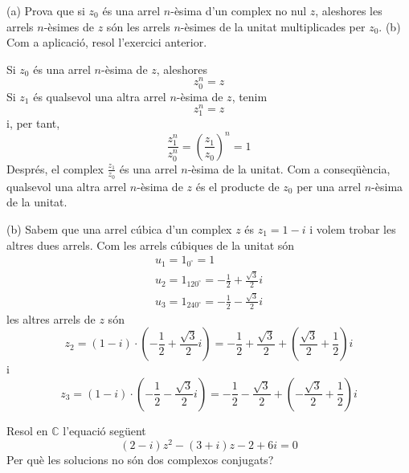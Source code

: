 \begin{exercici}
(a) Prova que si $z_{0}$ és una arrel $n$-èsima d’un complex no
nul $z$, aleshores les arrels $n$-èsimes de $z$ són les arrels
$n$-èsimes de la unitat multiplicades per $z_{0}$. (b) Com a aplicació, resol l’exercici anterior.
\end{exercici}

\begin{solucio}
Si $z_{0}$ és una arrel $n$-èsima de $z$, aleshores
\[
z_{0}^{n}=z
\]
Si $z_{1}$ és qualsevol una altra arrel $n$-èsima de $z$, tenim
\[
z_{1}^{n}=z
\]
i, per tant,
\[
\frac{z_{1}^{n}}{z_{0}^{n}}=\left( \frac{z_{1}}{z_{0}}\right) ^{n}=1
\]
Després, el complex $\frac{z_{1}}{z_{0}}$ és una arrel $n$-èsima de
la unitat. Com a conseqüència, qualsevol una altra arrel $n$-èsima de $z$
és el producte de $z_{0}$ per una arrel $n$-èsima de la unitat.

(b) Sabem que una arrel cúbica d’un complex $z$ és $z_{1}=1-i$ i
volem trobar les altres dues arrels. Com les arrels cúbiques de la unitat són
\[
\begin{array}{l}
u_{1}=1_{0
^{\circ}
}=1 \\
u_{2}=1_{120
^{\circ}
}=-\frac{1}{2}+\frac{\sqrt{3}}{2}i \\
u_{3}=1_{240
^{\circ}
}=-\frac{1}{2}-\frac{\sqrt{3}}{2}i
\end{array}
\]
les altres arrels de $z$ són
\[
z_{2}=(1-i)\cdot \left( -\frac{1}{2}+\frac{\sqrt{3}}{2}i\right) =-\frac{1}{2}
+\frac{\sqrt{3}}{2}+\left( \frac{\sqrt{3}}{2}+\frac{1}{2}\right) i
\]
i
\[
z_{3}=(1-i)\cdot \left( -\frac{1}{2}-\frac{\sqrt{3}}{2}i\right) =-\frac{1}{2}
-\frac{\sqrt{3}}{2}+\left( -\frac{\sqrt{3}}{2}+\frac{1}{2}\right) i
\]
\end{solucio}

\begin{exercici}
Resol en $\mathbb{C}$ l’equació següent
\[
(2-i)z^{2}-(3+i)z-2+6i=0
\]
Per què les solucions no són dos complexos conjugats?
\end{exercici}


